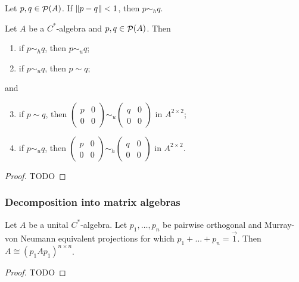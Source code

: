 \begin{proposition}
Let  $p,q\in \mathop{\mathcal{P}}\nolimits(A)$. If $\lVert p-q\rVert< 1$, then $p \sim_h q$.
\end{proposition}

\begin{proposition} \label{implicationsBeweenEquivalences}
Let $A$ be a $C^*$-algebra and $p,q\in\mathop{\mathcal{P}}\nolimits(A)$. Then
\begin{enumerate}
\item if $p\sim_h q$, then $p \sim_u q$;
\item if $p\sim_u q$, then $p \sim q$;
\end{enumerate}and
\begin{enumerate}
\setcounter{enumi}{2}
\item if $p\sim q$, then $\begin{pmatrix}
p & 0 \\ 0 & 0
\end{pmatrix} \sim_u \begin{pmatrix}
q & 0 \\ 0 & 0
\end{pmatrix}$ in $A^{2\times 2}$;
\item if $p\sim_u q$, then $\begin{pmatrix}
p & 0 \\ 0 & 0
\end{pmatrix} \sim_h \begin{pmatrix}
q & 0 \\ 0 & 0
\end{pmatrix}$ in $A^{2\times 2}$.
\end{enumerate}
\end{proposition}
\begin{proof}
TODO
\end{proof}
\subsubsection{Decomposition into matrix algebras}
\begin{proposition}
Let $A$ be a unital $C^*$-algebra. Let $p_1,\ldots ,p_n$ be pairwise orthogonal and Murray-von Neumann equivalent projections for which $p_1 + \ldots + p_n = \vec{1}$. Then $A \cong (p_1Ap_1)^{n\times n}$.
\end{proposition}
\begin{proof}
TODO
\end{proof}

